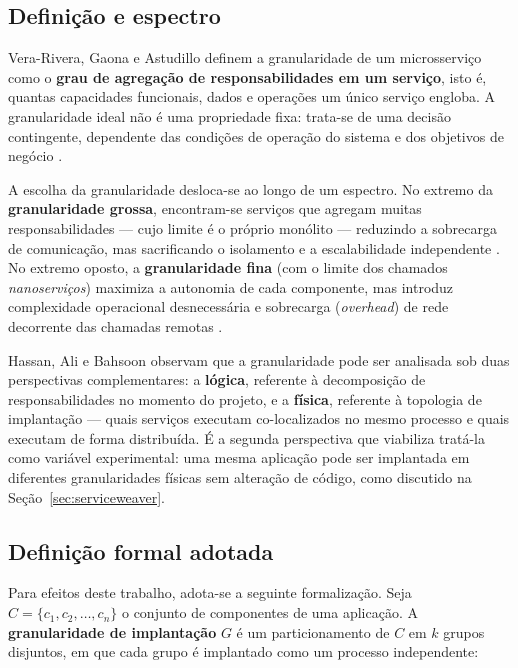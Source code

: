 \subsection{Definição e espectro}

Vera-Rivera, Gaona e Astudillo \cite{verarivera2021granularity} definem a granularidade de um microsserviço como o \textbf{grau de agregação de responsabilidades em um serviço}, isto é, quantas capacidades funcionais, dados e operações um único serviço engloba. A granularidade ideal não é uma propriedade fixa: trata-se de uma decisão contingente, dependente das condições de operação do sistema e dos objetivos de negócio \cite{hassan2020microservice}.

A escolha da granularidade desloca-se ao longo de um espectro. No extremo da \textbf{granularidade grossa}, encontram-se serviços que agregam muitas responsabilidades --- cujo limite é o próprio monólito --- reduzindo a sobrecarga de comunicação, mas sacrificando o isolamento e a escalabilidade independente \cite{mendonca2024serviceweaver}. No extremo oposto, a \textbf{granularidade fina} (com o limite dos chamados \textit{nanoserviços}) maximiza a autonomia de cada componente, mas introduz complexidade operacional desnecessária e sobrecarga (\textit{overhead}) de rede decorrente das chamadas remotas \cite{hassan2020microservice, mendonca2024serviceweaver}.

Hassan, Ali e Bahsoon \cite{hassan2017ambients} observam que a granularidade pode ser analisada sob duas perspectivas complementares: a \textbf{lógica}, referente à decomposição de responsabilidades no momento do projeto, e a \textbf{física}, referente à topologia de implantação --- quais serviços executam co-localizados no mesmo processo e quais executam de forma distribuída. É a segunda perspectiva que viabiliza tratá-la como variável experimental: uma mesma aplicação pode ser implantada em diferentes granularidades físicas sem alteração de código, como discutido na Seção~\ref{sec:serviceweaver}.

\subsection{Definição formal adotada}

Para efeitos deste trabalho, adota-se a seguinte formalização. Seja $C = \{c_1, c_2, \ldots, c_n\}$ o conjunto de componentes de uma aplicação. A \textbf{granularidade de implantação} $G$ é um particionamento de $C$ em $k$ grupos disjuntos, em que cada grupo é implantado como um processo independente:

